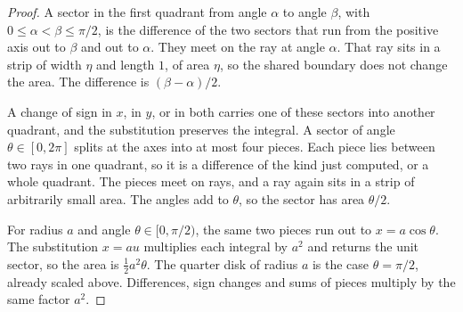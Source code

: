 \begin{proof}
A sector in the first quadrant from angle $\alpha$ to angle $\beta$, with $0\le\alpha<\beta\le\pi/2$, is the difference of the two sectors that run from the positive axis out to $\beta$ and out to $\alpha$. They meet on the ray at angle $\alpha$. That ray sits in a strip of width $\eta$ and length $1$, of area $\eta$, so the shared boundary does not change the area. The difference is $(\beta-\alpha)/2$.

A change of sign in $x$, in $y$, or in both carries one of these sectors into another quadrant, and the substitution preserves the integral. A sector of angle $\theta\in[0,2\pi]$ splits at the axes into at most four pieces. Each piece lies between two rays in one quadrant, so it is a difference of the kind just computed, or a whole quadrant. The pieces meet on rays, and a ray again sits in a strip of arbitrarily small area. The angles add to $\theta$, so the sector has area $\theta/2$.

For radius $a$ and angle $\theta\in[0,\pi/2)$, the same two pieces run out to $x=a\cos\theta$. The substitution $x=au$ multiplies each integral by $a^2$ and returns the unit sector, so the area is $\tfrac12 a^2\theta$. The quarter disk of radius $a$ is the case $\theta=\pi/2$, already scaled above. Differences, sign changes and sums of pieces multiply by the same factor $a^2$.
\end{proof}

